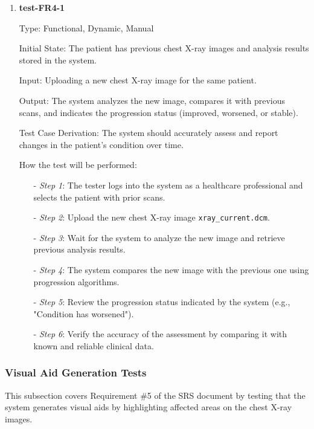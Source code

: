 \documentclass[12pt, titlepage]{article}
\begin{document}
\begin{enumerate}

\item \textbf{test-FR4-1} \label{test-FR4-1}

Type: Functional, Dynamic, Manual

Initial State: The patient has previous chest X-ray images and analysis results stored in the system.

Input: Uploading a new chest X-ray image for the same patient.

Output: The system analyzes the new image, compares it with previous scans, and indicates the progression status (improved, worsened, or stable).

Test Case Derivation: The system should accurately assess and report changes in the patient's condition over time.

How the test will be performed:

\begin{itemize}
  \item[-] \textit{Step 1}: The tester logs into the system as a healthcare professional and selects the patient with prior scans.
  \item[-] \textit{Step 2}: Upload the new chest X-ray image \texttt{xray\_current.dcm}.
  \item[-] \textit{Step 3}: Wait for the system to analyze the new image and retrieve previous analysis results.
  \item[-] \textit{Step 4}: The system compares the new image with the previous one using progression algorithms.
  \item[-] \textit{Step 5}: Review the progression status indicated by the system (e.g., "Condition has worsened").
  \item[-] \textit{Step 6}: Verify the accuracy of the assessment by comparing it with known and reliable clinical data.
\end{itemize}

\end{enumerate}

\subsubsection{ Visual Aid Generation Tests}

This subsection covers Requirement \#5 of the SRS document by testing that the system generates visual aids by highlighting affected areas on the chest X-ray images.
\end{document}
